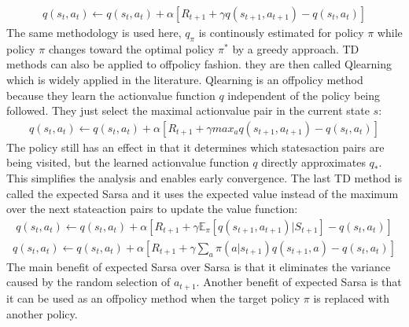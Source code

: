 \documentclass[letterpaper,10pt,english]{jupyterBook}
\begin{document}
\begin{equation*}
\begin{split} q(s_t, a_t) \leftarrow q(s_t, a_t) + \alpha[R_{t+1} + \gamma q(s_{t+1}, a_{t+1}) - q(s_t, a_t)] \end{split}
\end{equation*}
\sphinxAtStartPar
The same methodology is used here, \(q_\pi\) is continously estimated for policy \(\pi\) while policy \(\pi\) changes toward the optimal policy \(\pi^*\) by a greedy approach. TD methods can also be applied to off\sphinxhyphen{}policy fashion. they are then called Q\sphinxhyphen{}learning which is widely applied in the literature. Q\sphinxhyphen{}learning is an off\sphinxhyphen{}policy method because they learn the action\sphinxhyphen{}value function \(q\) independent of the policy being followed. They just select the maximal action\sphinxhyphen{}value pair in the current state \(s\):
\begin{equation*}
\begin{split}  q(s_t, a_t) \leftarrow q(s_t, a_t) + \alpha[R_{t+1} + \gamma max_a q(s_{t+1}, a_{t+1}) - q(s_t, a_t)]  \end{split}
\end{equation*}
\sphinxAtStartPar
The policy still has an effect in that it determines which states\sphinxhyphen{}action pairs are being visited, but the learned action\sphinxhyphen{}value function \(q\) directly approximates \(q_*\). This simplifies the analysis and enables early convergence. The last TD method is called the expected Sarsa and it uses the expected value instead of the maximum over the next state\sphinxhyphen{}action pairs to update the value function:
\begin{equation*}
\begin{split}  q(s_t, a_t) \leftarrow q(s_t, a_t) + \alpha[R_{t+1} + \gamma \mathbb{E}_{\pi}[q(s_{t+1}, a_{t+1})|S_{t+1}] - q(s_t, a_t)] \end{split}
\end{equation*}\begin{equation*}
\begin{split} q(s_t, a_t) \leftarrow q(s_t, a_t) + \alpha[R_{t+1} + \gamma \sum_a \pi(a|s_{t+1}) q(s_{t+1}, a) - q(s_t, a_t)] \end{split}
\end{equation*}
\sphinxAtStartPar
The main benefit of expected Sarsa over Sarsa is that it eliminates the variance caused by the random selection of \(a_{t+1}\). Another benefit of expected Sarsa is that it can be used as an off\sphinxhyphen{}policy method when the target policy \(\pi\) is replaced with another policy.
\end{document}
